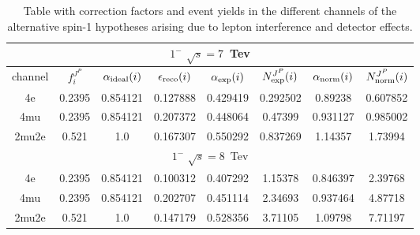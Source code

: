 
\begin{table}[b]
\centering
\caption{
Table with correction factors and event yields in the different
channels of the alternative spin-1 hypotheses arising
due to lepton interference and detector effects.}
\centering %
\begin{tabular}{c c c c c c c c} %
\hline \hline

 \multicolumn{8}{|c|}{$1^{-}$ $\sqrt{s}=7$~Tev} \\ \hline 

channel & $f_{i}^{J^P}$ & $\alpha_{\rm ideal} (i)$ & $\epsilon_{\rm reco} (i)$ & $\alpha_{\rm exp} (i)$ & $N^{J^P}_{\rm exp} (i)$ & $\alpha_{\rm norm} (i)$ & $N^{J^P}_{\rm norm} (i)$\\ \hline 
4e & 0.2395 & 0.854121 & 0.127888 & 0.429419
 & 0.292502%
 & 0.89238 & 0.607852 \\ \hline 
4mu & 0.2395 & 0.854121 & 0.207372 & 0.448064
 & 0.47399%
 & 0.931127 & 0.985002 \\ \hline 
2mu2e & 0.521 & 1.0  & 0.167307 & 0.550292
 & 0.837269%
 & 1.14357 & 1.73994 \\ \hline \hline 

 \multicolumn{8}{|c|}{$1^{-}$ $\sqrt{s}=8$~Tev} \\ \hline 

4e & 0.2395 & 0.854121 & 0.100312 & 0.407292
 & 1.15378%
 & 0.846397 & 2.39768 \\ \hline 
4mu & 0.2395 & 0.854121 & 0.202707 & 0.451114
 & 2.34693%
 & 0.937464 & 4.87718 \\ \hline 
2mu2e & 0.521 & 1.0  & 0.147179 & 0.528356
 & 3.71105%
 & 1.09798 & 7.71197 \\ \hline \hline 


\end{tabular}
\end{table}
